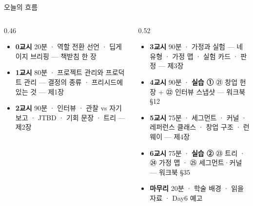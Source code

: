 \begin{frame}{오늘의 흐름}
\begin{columns}[T]
\begin{column}{0.46\textwidth}
\begin{itemize}
\item \textbf{0교시} 20분 · 역할 전환 선언 · 딥게이지 브리핑 — 책받침 한 장
\item \textbf{1교시} 80분 · 프로젝트 관리와 프로덕트 관리 — 결정의 종류 · 프리시드에 있는 것 — 제1장
\item \textbf{2교시} 90분 · 인터뷰 · 관찰 vs 자기 보고 · JTBD · 기회 문장 · 트리 — 제2장
\end{itemize}
\end{column}
\begin{column}{0.52\textwidth}
\begin{itemize}
\item \textbf{3교시} 90분 · 가정과 실험 — 네 유형 · 가정 맵 · 실험 카드 · 판정 — 제3장
\item \textbf{4교시} 90분 · \textbf{실습 ①} ㉑ 창업 헌장 + ㉒ 인터뷰 스냅샷 — 워크북 §1\til{}2
\item \textbf{5교시} 75분 · 세그먼트 · 커널 · 레퍼런스 클래스 · 창업 구조 · 런웨이 — 제4장
\item \textbf{6교시} 75분 · \textbf{실습 ②} ㉓ 트리 · ㉔ 가정 맵 · ㉕ 세그먼트·커널 — 워크북 §3\til{}5
\item \textbf{마무리} 20분 · 학술 배경 · 읽을 자료 · Day6 예고
\end{itemize}
\end{column}
\end{columns}
\end{frame}

